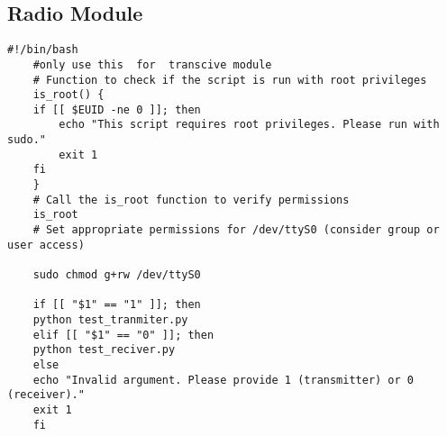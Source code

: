 \subsection{Radio Module}
\begin{lstlisting}[style=bashstyle,caption={Code for the testing serial of the radio module}]
    #!/bin/bash
    #only use this  for  transcive module
    # Function to check if the script is run with root privileges
    is_root() {
    if [[ $EUID -ne 0 ]]; then
        echo "This script requires root privileges. Please run with sudo."
        exit 1
    fi
    }
    # Call the is_root function to verify permissions
    is_root
    # Set appropriate permissions for /dev/ttyS0 (consider group or user access)

    sudo chmod g+rw /dev/ttyS0

    if [[ "$1" == "1" ]]; then
    python test_tranmiter.py
    elif [[ "$1" == "0" ]]; then
    python test_reciver.py
    else
    echo "Invalid argument. Please provide 1 (transmitter) or 0 (receiver)."
    exit 1
    fi
\end{lstlisting}